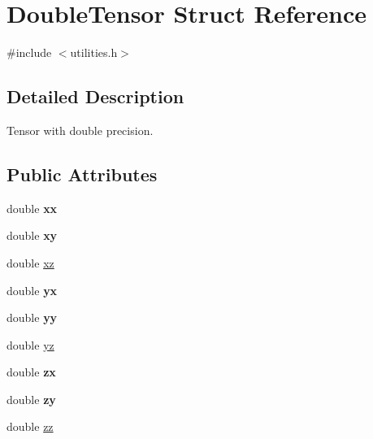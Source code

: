 \hypertarget{structDoubleTensor}{\section{Double\-Tensor Struct Reference}
\label{structDoubleTensor}
}


{\ttfamily \#include $<$utilities.\-h$>$}



\subsection{Detailed Description}
Tensor with double precision. \subsection*{Public Attributes}
\begin{DoxyCompactItemize}
\item 
\hypertarget{structDoubleTensor_aaf7d0b05510b5483fd424c8878729e41}{double {\bfseries xx}}\label{structDoubleTensor_aaf7d0b05510b5483fd424c8878729e41}

\item 
\hypertarget{structDoubleTensor_a520cb8bf429e0331c1179806338b88cc}{double {\bfseries xy}}\label{structDoubleTensor_a520cb8bf429e0331c1179806338b88cc}

\item 
double \hyperlink{structDoubleTensor_a78677cd002a23db74c7438a9e51aa264}{xz}
\item 
\hypertarget{structDoubleTensor_a66c6e6767a51f4259d28e9d0cd9629e6}{double {\bfseries yx}}\label{structDoubleTensor_a66c6e6767a51f4259d28e9d0cd9629e6}

\item 
\hypertarget{structDoubleTensor_a05409acca2da664a1f7d4edc2c0934b9}{double {\bfseries yy}}\label{structDoubleTensor_a05409acca2da664a1f7d4edc2c0934b9}

\item 
double \hyperlink{structDoubleTensor_a0311ca5318233d1cd146c7f2ba0564a2}{yz}
\item 
\hypertarget{structDoubleTensor_a755deaf39decc01a9b1d672df38a8d28}{double {\bfseries zx}}\label{structDoubleTensor_a755deaf39decc01a9b1d672df38a8d28}

\item 
\hypertarget{structDoubleTensor_a3a2b653bb874c8c4faf2fa3a87054ad1}{double {\bfseries zy}}\label{structDoubleTensor_a3a2b653bb874c8c4faf2fa3a87054ad1}

\item 
double \hyperlink{structDoubleTensor_af3fec476b850d04a0f1e7a4cfbaceb2d}{zz}
\end{DoxyCompactItemize}


